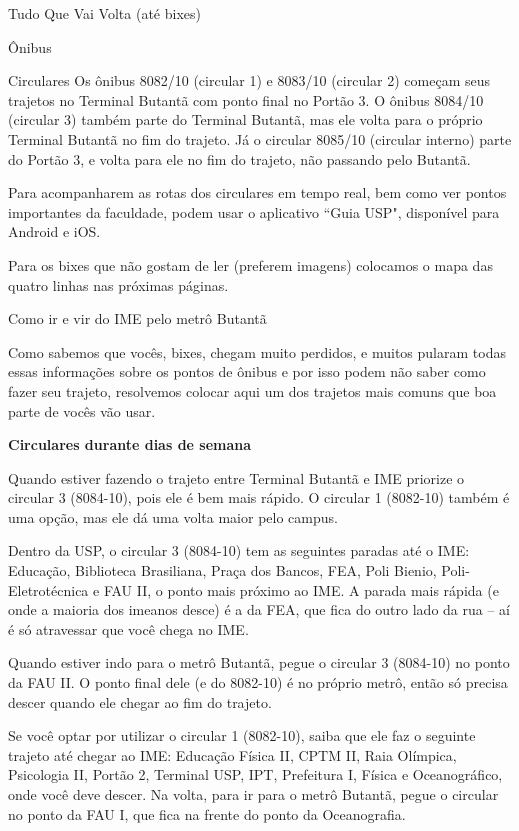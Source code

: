 \begin{secao}{Tudo Que Vai Volta (até bixes)}
\begin{subsecao}{Ônibus}
\begin{subsubsecao}{Circulares}
Os ônibus 8082/10 (circular 1) e 8083/10 (circular 2) começam seus trajetos no 
Terminal Butantã com ponto final no Portão 3. O ônibus 8084/10 (circular 3) também 
parte do Terminal Butantã, mas ele volta para o próprio Terminal Butantã no fim do trajeto. 
Já o circular 8085/10 (circular interno) parte do Portão 3, e volta para ele no fim 
do trajeto, não passando pelo Butantã.

Para acompanharem as rotas dos circulares em tempo real, bem como ver pontos
importantes da faculdade, podem usar o aplicativo ``Guia USP", disponível para
Android e iOS.

Para os bixes que não gostam de ler (preferem imagens) colocamos o
mapa das quatro linhas nas próximas páginas.



\end{subsubsecao}

\begin{subsubsecao}{Como ir e vir do IME pelo metrô Butantã}

Como sabemos que vocês, bixes, chegam muito perdidos, e muitos pularam todas
essas informações sobre os pontos de ônibus e por isso podem não saber como
fazer seu trajeto, resolvemos colocar aqui um dos trajetos mais comuns que boa
parte de vocês vão usar.

{\bf Circulares durante dias de semana}

Quando estiver fazendo o trajeto entre Terminal Butantã e IME priorize o circular 3
(8084-10), pois ele é bem mais rápido. O circular 1 (8082-10) também é uma opção, mas
ele dá uma volta maior pelo campus.

Dentro da USP, o circular 3 (8084-10) tem as seguintes paradas até o IME: Educação, 
Biblioteca Brasiliana, Praça dos Bancos, FEA, Poli Bienio, Poli-Eletrotécnica e FAU II,
o ponto mais próximo ao IME. A parada mais rápida (e onde a maioria dos imeanos desce) 
é a da FEA, que fica do outro lado da rua -- aí é só atravessar que você chega no IME.

Quando estiver indo para o metrô Butantã, pegue o circular 3 (8084-10) no ponto da FAU II.
O ponto final dele (e do 8082-10) é no próprio metrô, então só precisa descer quando ele 
chegar ao fim do trajeto.

Se você optar por utilizar o circular 1 (8082-10), saiba que ele faz o seguinte trajeto 
até chegar ao IME: Educação Física II, CPTM II, Raia Olímpica, Psicologia II, Portão 2, 
Terminal USP, IPT, Prefeitura I, Física e Oceanográfico, onde você deve descer. Na 
volta, para ir para o metrô Butantã, pegue o circular no ponto da FAU I, que fica na frente
do ponto da Oceanografia.


\end{subsubsecao}
\end{subsecao}
\end{secao}
